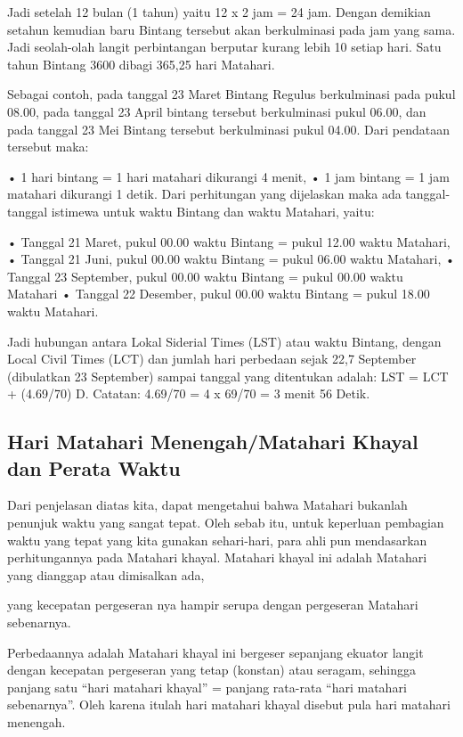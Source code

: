 Jadi setelah 12 bulan (1 tahun) yaitu  12 x 2 jam = 24 jam. Dengan demikian setahun
 kemudian baru Bintang tersebut akan berkulminasi pada jam yang sama. 
 Jadi seolah-olah langit perbintangan berputar kurang lebih 10 setiap hari. 
 Satu tahun Bintang 3600 dibagi 365,25 hari Matahari.

Sebagai contoh, pada tanggal 23 Maret Bintang Regulus berkulminasi pada pukul 08.00,
 pada tanggal 23 April bintang tersebut berkulminasi pukul 06.00, dan pada tanggal 23 Mei 
 Bintang tersebut berkulminasi pukul 04.00. Dari pendataan tersebut maka: 

 • 1 hari bintang = 1 hari matahari dikurangi 4 menit, 
 • 1 jam bintang = 1 jam matahari dikurangi 1 detik. 
 Dari perhitungan yang dijelaskan maka ada tanggal-tanggal istimewa 
 untuk waktu Bintang dan waktu Matahari, yaitu:
 
	• Tanggal 21 Maret, pukul 00.00 waktu Bintang = pukul 12.00 waktu Matahari,
	• Tanggal 21 Juni, pukul 00.00 waktu Bintang = pukul 06.00 waktu Matahari,
	• Tanggal 23 September, pukul 00.00 waktu Bintang = pukul 00.00 waktu Matahari
	• Tanggal 22 Desember, pukul 00.00 waktu Bintang = pukul 18.00 waktu Matahari.
	

 Jadi hubungan antara Lokal Siderial Times (LST) atau waktu Bintang, 
 dengan Local Civil Times (LCT) dan jumlah hari perbedaan sejak 22,7 September 
 (dibulatkan 23 September) sampai tanggal yang ditentukan adalah:
 LST = LCT + (4.69/70) D. Catatan: 4.69/70 = 4 x 69/70 = 3 menit 56 Detik.	
 
\subsection{Hari Matahari Menengah/Matahari Khayal dan Perata Waktu}
 Dari penjelasan diatas kita, dapat mengetahui bahwa Matahari bukanlah penunjuk 
 waktu yang sangat tepat. Oleh sebab itu, untuk keperluan pembagian waktu yang tepat
 yang kita gunakan sehari-hari, para ahli pun mendasarkan perhitungannya pada Matahari
 khayal. Matahari khayal ini adalah Matahari yang dianggap atau dimisalkan ada, 

 yang kecepatan pergeseran nya hampir serupa dengan pergeseran Matahari sebenarnya.
 
Perbedaannya adalah Matahari khayal ini bergeser sepanjang ekuator langit 
 dengan kecepatan pergeseran yang tetap (konstan) atau seragam, sehingga panjang satu
 “hari matahari khayal” = panjang rata-rata “hari matahari sebenarnya”. 
 Oleh karena itulah hari matahari khayal disebut pula hari matahari menengah.

